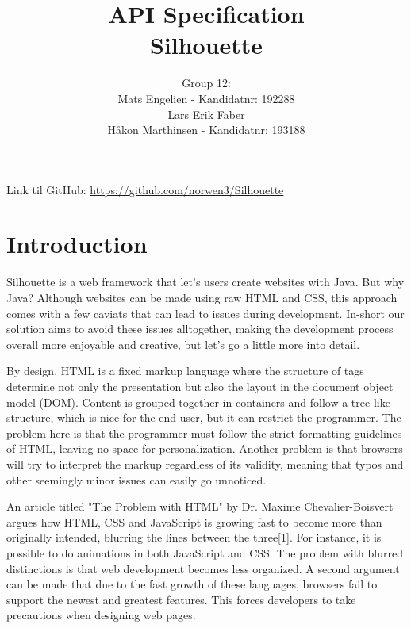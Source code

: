 \documentclass[12pt]{article}
\begin{document}
\title{%
    API Specification\\
    \large Silhouette}
\author{%
    Group 12:\\
    Mats Engelien - Kandidatnr: 192288\\
    Lars Erik Faber\\
    Håkon Marthinsen - Kandidatnr: 193188}
\date{}
\maketitle

\thispagestyle{empty}

\newpage

\tableofcontents

\thispagestyle{empty}

\newpage

\setcounter{page}{1}

Link til GitHub: \href{https://github.com/norwen3/Silhouette}{https://github.com/norwen3/Silhouette}

\section{Introduction}

Silhouette is a web framework that let's users create websites with Java. But why Java? Although websites can be made using raw HTML and CSS, this approach comes with a few caviats that can lead to issues during development. In-short our solution aims to avoid these issues alltogether, making the development process overall more enjoyable and creative, but let's go a little more into detail.

By design, HTML is a fixed markup language where the structure of tags determine not only the presentation but also the layout in the document object model (DOM). Content is grouped together in containers and follow a tree-like structure, which is nice for the end-user, but it can restrict the programmer. The problem here is that the programmer must follow the strict formatting guidelines of HTML, leaving no space for personalization. Another problem is that browsers will try to interpret the markup regardless of its validity, meaning that typos and other seemingly minor issues can easily go unnoticed.

An article titled "The Problem with HTML" by Dr. Maxime Chevalier-Boisvert argues how HTML, CSS and JavaScript is growing fast to become more than originally intended, blurring the lines between the three[1]. For instance, it is possible to do animations in both JavaScript and CSS. The problem with blurred distinctions is that web development becomes less organized. A second argument can be made that due to the fast growth of these languages, browsers fail to support the newest and greatest features. This forces developers to take precautions when designing web pages.
\end{document}
